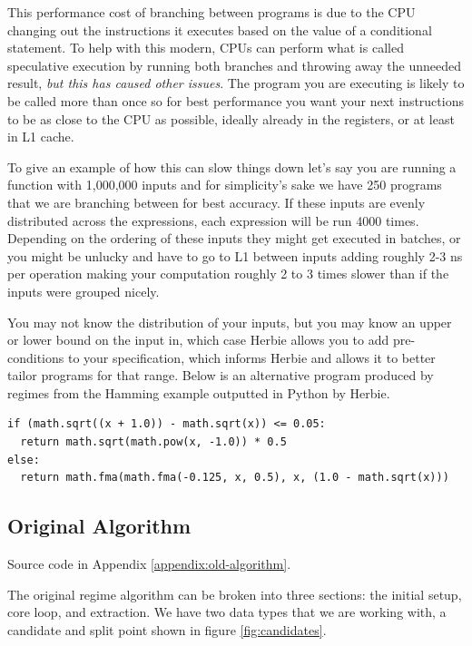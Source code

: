\documentclass{article}
\begin{document}
This performance cost of branching between programs is due to the CPU changing out the instructions it executes based on the value of a conditional statement. To help with this modern, CPUs can perform what is called speculative execution by running both branches and throwing away the unneeded result, \textit{but this has caused other issues}. The program you are executing is likely to be called more than once so for best performance you want your next instructions to be as close to the CPU as possible, ideally already in the registers,  or at least in L1 cache.

To give an example of how this can slow things down let's say you are running a function with 1,000,000 inputs and for simplicity's sake we have 250 programs that we are branching between for best accuracy. If these inputs are evenly distributed across the expressions, each expression will be run 4000 times. Depending on the ordering of these inputs they might get executed in batches, or you might be unlucky and have to go to L1 between inputs adding roughly 2-3 ns per operation making your computation roughly 2 to 3 times slower than if the inputs were grouped nicely. 

You may not know the distribution of your inputs, but you may know an upper or lower bound on the input in, which case Herbie allows you to add pre-conditions to your specification, which informs Herbie and allows it to better tailor programs for that range. Below is an alternative program produced by regimes from the Hamming example outputted in Python by Herbie. 

\begin{center}
\begin{lstlisting}
if (math.sqrt((x + 1.0)) - math.sqrt(x)) <= 0.05:
  return math.sqrt(math.pow(x, -1.0)) * 0.5
else:
  return math.fma(math.fma(-0.125, x, 0.5), x, (1.0 - math.sqrt(x)))
\end{lstlisting}
\end{center}

\subsection{Original Algorithm}

Source code in Appendix \ref{appendix:old-algorithm}.

The original regime algorithm can be broken into three sections: the initial setup, core loop, and extraction. We have two data types that we are working with, a candidate and split point shown in figure \ref{fig:candidates}. 
\end{document}
